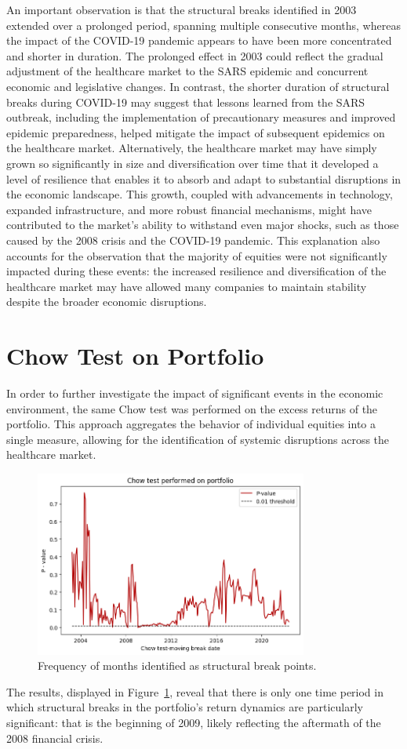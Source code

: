 An important observation is that the structural breaks identified in 2003 extended over a prolonged period, spanning multiple
consecutive months, whereas the impact of the COVID-19 pandemic appears to have been more concentrated and shorter in duration.
The prolonged effect in 2003 could reflect the gradual adjustment of the healthcare market to the SARS epidemic and concurrent
economic and legislative changes.
In contrast, the shorter duration of structural breaks during COVID-19 may suggest that lessons learned from the SARS outbreak,
including the implementation of precautionary measures and improved epidemic preparedness, helped mitigate the impact of
subsequent epidemics on the healthcare market.
Alternatively, the healthcare market may have simply grown so significantly in size and diversification over time that it 
developed a level of resilience that enables it to absorb and adapt to substantial disruptions in the economic landscape.
This growth, coupled with advancements in technology, expanded infrastructure, and more robust financial mechanisms,
might have contributed to the market's ability to withstand even major shocks, such as those caused by the 2008 crisis and
the COVID-19 pandemic.
This explanation also accounts for the observation that the majority of equities were not significantly impacted during these
events: the increased resilience and diversification of the healthcare market may have allowed many companies to maintain
stability despite the broader economic disruptions.

\section{Chow Test on Portfolio}

In order to further investigate the impact of significant events in the economic environment, the same Chow test was 
performed on the excess returns of the portfolio. 
This approach aggregates the behavior of individual equities into a single measure, allowing for the identification of 
systemic disruptions across the healthcare market.

\begin{figure}[h!]
    \centering
    \includegraphics[width=0.8\textwidth]{images/portchowlio.png}
    \caption{Frequency of months identified as structural break points.}\label{fig:portchowlio}
\end{figure}

The results, displayed in Figure~\ref{fig:portchowlio}, reveal that there is only one time period in which structural breaks 
in the portfolio's return dynamics are particularly significant: that is the beginning of 2009, likely reflecting the
aftermath of the 2008 financial crisis.
